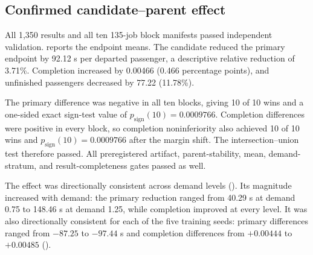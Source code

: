 \subsection{Confirmed candidate--parent effect}
\label{sec:exp:primary_results}

All 1,350 results and all ten 135-job block manifests passed independent
validation.  reports the endpoint means. The candidate
reduced the primary endpoint by 92.12 s per departed passenger, a descriptive
relative reduction of 3.71\%. Completion increased by 0.00466 (0.466
percentage points), and unfinished passengers decreased by 77.22 (11.78\%).

\begin{table}[t]
\centering
\small
\caption{Formal endpoint means for the preregistered candidate and its direct
behavior parent. Differences are candidate minus parent, computed before
rounding the displayed means.}
\label{tab:formal_primary}
\end{table}

The primary difference was negative in all ten blocks, giving 10 of 10 wins
and a one-sided exact sign-test value of $p_{\mathrm{sign}}(10)=0.0009766$. Completion differences
were positive in every block, so completion noninferiority also achieved 10 of
10 wins and $p_{\mathrm{sign}}(10)=0.0009766$ after the margin shift. The intersection--union test
therefore passed. All preregistered artifact, parent-stability, mean,
demand-stratum, and result-completeness gates passed as well.

The effect was directionally consistent across demand levels
(). Its magnitude increased with demand: the primary
reduction ranged from 40.29 s at demand 0.75 to 148.46 s at demand 1.25, while
completion improved at every level. It was also directionally consistent for
each of the five training seeds: primary differences ranged from $-87.25$ to
$-97.44$ s and completion differences from $+0.00444$ to $+0.00485$
().

